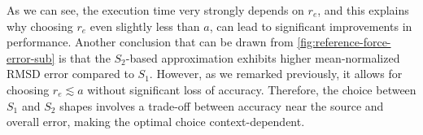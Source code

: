 As we can see, the execution time very strongly depends on $r_e$, and this explains why choosing $r_e$ even slightly less than $a$, can lead to significant improvements in performance.
Another conclusion that can be drawn from \autoref{fig:reference-force-error-sub} is that the \( S_2 \)-based approximation exhibits higher mean-normalized RMSD error compared to \( S_1 \).
However, as we remarked previously, it allows for choosing $r_e \lesssim a$ without significant loss of accuracy.
Therefore, the choice between \( S_1 \) and \( S_2 \) shapes involves a trade-off between accuracy near the source and overall error, making the optimal choice context-dependent.

